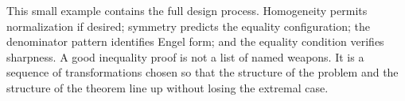 This small example contains the full design process.  Homogeneity permits normalization if desired; symmetry predicts the equality configuration; the denominator pattern identifies Engel form; and the equality condition verifies sharpness.  A good inequality proof is not a list of named weapons.  It is a sequence of transformations chosen so that the structure of the problem and the structure of the theorem line up without losing the extremal case.
